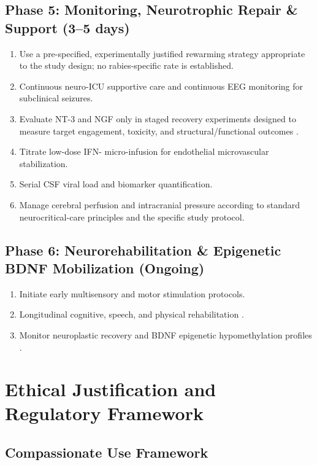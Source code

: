 \documentclass[12pt,a4paper]{article}
\begin{document}
\subsection{Phase 5: Monitoring, Neurotrophic Repair \& Support (3--5 days)}
\begin{enumerate}
    \item Use a pre-specified, experimentally justified rewarming strategy appropriate to the study design; no rabies-specific rate is established.
    \item Continuous neuro-ICU supportive care and continuous EEG monitoring for subclinical seizures.
    \item Evaluate NT-3 and NGF only in staged recovery experiments designed to measure target engagement, toxicity, and structural/functional outcomes \citep{scott2008rabies, xu2023nt3, gluska2014p75}.
    \item Titrate low-dose IFN-\textbeta{} micro-infusion for endothelial microvascular stabilization.
    \item Serial CSF viral load and biomarker quantification.
    \item Manage cerebral perfusion and intracranial pressure according to standard neurocritical-care principles and the specific study protocol.
\end{enumerate}

\subsection{Phase 6: Neurorehabilitation \& Epigenetic BDNF Mobilization (Ongoing)}
\begin{enumerate}
    \item Initiate early multisensory and motor stimulation protocols.
    \item Longitudinal cognitive, speech, and physical rehabilitation .
    \item Monitor neuroplastic recovery and BDNF epigenetic hypomethylation profiles \citep{heinsberg2026bdnf}.
\end{enumerate}

\section{Ethical Justification and Regulatory Framework}

\subsection{Compassionate Use Framework}
\end{document}
